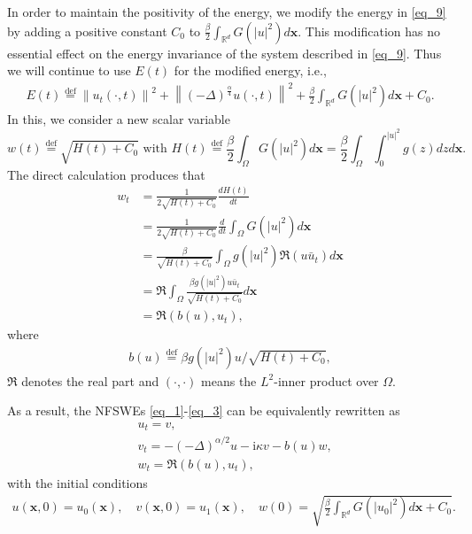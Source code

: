 \documentclass[preprint,compress,3p,10pt,fleqn]{elsarticle}
\numberwithin{equation}{section}
\begin{document}
In order to maintain the positivity of the energy, we modify the energy in \eqref{eq_9} by adding a positive constant $C_0$ to $\frac{\beta}{2} \int_{\mathbb{R}^d} G\left(|u|^2\right) d \boldsymbol{x}$. This modification has no essential effect on the energy invariance of the system described in \eqref{eq_9}. Thus we will continue to use $E(t)$ for the modified energy, i.e.,
\begin{align}\label{eq_9_1}
E(t)\overset{\text{def}}{=}\left\|u_{t}(\cdot, t)\right\|^{2}+\left\|(-\Delta)^{\frac{\alpha}{4}} u(\cdot, t)\right\|^{2}+\frac{\beta}{2} \int_{\mathbb{R}^d} G\left(|u|^2\right) d \boldsymbol{x} + C_0.
\end{align}
In this, we consider a new scalar variable
\begin{equation}
w(t)\overset{\text{def}}{=}\sqrt{H(t)+C_0} \text { with } H(t)\overset{\text{def}}{=}\frac{\beta}{2} \int_{\Omega} G\left(|u|^2\right) d \boldsymbol{x}=\frac{\beta}{2}\int_{\Omega} \int_0^{|u|^2} g(z) d z d \boldsymbol{x}.
\end{equation}
The direct calculation produces that
\begin{align}
w_t & =\frac{1}{2 \sqrt{H(t)+C_0}} \frac{d H(t)}{d t} \nonumber\\
& =\frac{1}{2 \sqrt{H(t)+C_0}} \frac{d}{d t} \int_{\Omega} G(|u|^2) d \boldsymbol{x} \nonumber\\
& =\frac{\beta}{\sqrt{H(t)+C_0}} \int_{\Omega} g(|u|^2) \Re\left(u \bar{u}_t\right) d \boldsymbol{x}\nonumber\\
& =\Re \int_{\Omega} \frac{\beta g(|u|^2) u \bar{u}_t}{\sqrt{H(t)+C_0}} d \boldsymbol{x} \nonumber\\
& =\Re\left(b(u), u_t\right), \label{eq:2-1}
\end{align}
where
\begin{align}
b(u)\overset{\text{def}}{=}\beta g(|u|^2) u / \sqrt{H(t)+C_0},
\end{align}
$\Re$ denotes the real part and $(\cdot, \cdot)$ means the $L^2$-inner product over $\Omega$.
	
As a result, the NFSWEs \eqref{eq_1}-\eqref{eq_3} can be equivalently rewritten as
\begin{align}
& u_t=v, \label{eq:2-2}\\
& v_t=-(-\Delta)^{\alpha / 2} u-\mathrm{i}\kappa v-b(u) w, \label{eq:2-3}\\
& w_t=\Re\left(b(u), u_t\right),\label{eq:2-4}
\end{align}
with the initial conditions
\begin{align}\label{eq_31}
u(\boldsymbol{x}, 0)=u_{0}(\boldsymbol{x}), \quad v(\boldsymbol{x}, 0)=u_{1}(\boldsymbol{x}), \quad w(0)=\sqrt{\frac{\beta}{2} \int_{\mathbb{R}^d} G\left(|u_{0}|^2\right) d \boldsymbol{x} +C_0}.
\end{align}
	
\end{document}
